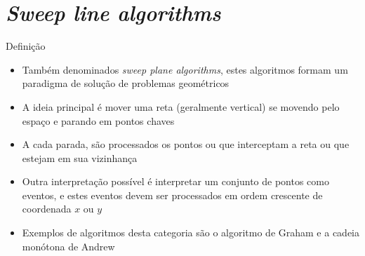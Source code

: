 \section{\it Sweep line algorithms}

\begin{frame}[fragile]{Definição}

    \begin{itemize}
        \item Também denominados \textit{sweep plane algorithms}, estes algoritmos formam
            um paradigma de solução de problemas geométricos

        \item A ideia principal é mover uma reta (geralmente vertical) se movendo pelo espaço e
            parando em pontos chaves

        \item A cada parada, são processados os pontos ou que interceptam a reta ou que estejam
            em sua vizinhança

        \item Outra interpretação possível é interpretar um conjunto de pontos como eventos, e
            estes eventos devem ser processados em ordem crescente de coordenada $x$ ou $y$

        \item Exemplos de algoritmos desta categoria são o algoritmo de Graham e a cadeia monótona
            de Andrew
   \end{itemize}

\end{frame}
